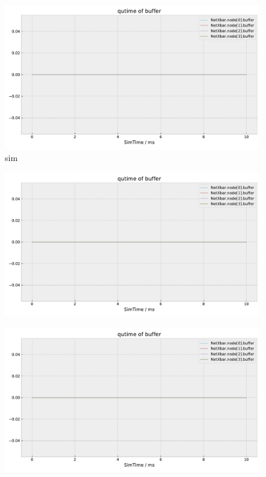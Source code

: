 \documentclass[]{scrartcl}
\begin{document}
\begin{figure}[H]
    \centering
    \includegraphics[width=\columnwidth, page=2]{../../python/results/postopt-General-0}
    \caption{sim}%
    \label{fig:postopt-inport-qlen}
\end{figure}
\begin{figure}[H]
    \centering
    \includegraphics[width=\columnwidth, page=8]{../../python/results/postopt-General-0}
    \caption{}%
    \label{fig:postopt-app-e2e}
\end{figure}
\begin{figure}[H]
    \centering
    \includegraphics[width=\columnwidth, page=4]{../../python/results/postopt-General-0}
    \caption{}%
    \label{fig:postopt-arbiter-qlen}
\end{figure}
\end{document}
